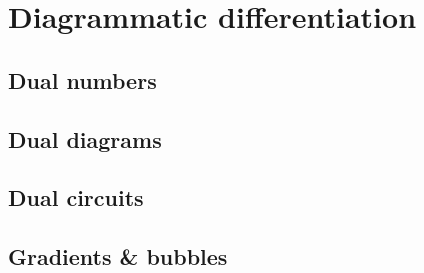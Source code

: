 
\section{Diagrammatic differentiation} \label{chapter-3:diag-diff}
\subsection{Dual numbers}
\subsection{Dual diagrams}
\subsection{Dual circuits}
\subsection{Gradients \& bubbles}
